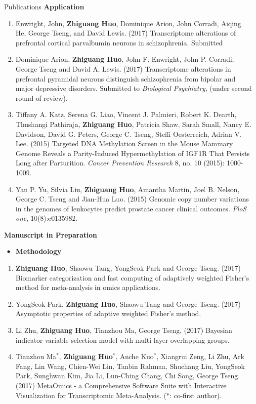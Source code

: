\documentclass{resume} %
\begin{document}
\begin{rSection}{Publications}
\textbf{Application}
\begin{enumerate}[noitemsep,topsep=0pt,resume]
\item Enwright, John, {\bf Zhiguang Huo}, Dominique Arion, John Corradi, Aiqing He, George Tseng, and David Lewis. (2017) 
Transcriptome alterations of prefrontal cortical parvalbumin neurons in schizophrenia. Submitted

    \item  Dominique Arion, {\bf Zhiguang Huo}, John F. Enwright, John P. Corradi, George Tseng and David A. Lewis. (2017)
Transcriptome alterations in prefrontal pyramidal neurons distinguish schizophrenia from bipolar and major depressive disorders.
Submitted to \emph{Biological Psychiatry}, (under second round of review).

    \item Tiffany A. Katz, Serena G. Liao, Vincent J. Palmieri, Robert K. Dearth, Thushangi Pathiraja, {\bf Zhiguang Huo}, Patricia Shaw, Sarah Small, Nancy E. Davidson, David G. Peters, George C. Tseng, Steffi Oesterreich, Adrian V. Lee. (2015) Targeted DNA Methylation Screen in the Mouse Mammary Genome Reveals a Parity-Induced Hypermethylation of IGF1R That Persists Long after Parturition. \emph{Cancer Prevention Research} 8, no. 10 (2015): 1000-1009.

    \item Yan P. Yu, Silvia Liu, {\bf Zhiguang Huo}, Amantha Martin, Joel B. Nelson, George C. Tseng and Jian-Hua Luo. (2015) Genomic copy number variations in the genomes of leukocytes predict prostate cancer clinical outcomes. \emph{PloS one}, 10(8):e0135982.

\end{enumerate}

\textbf{Manuscript in Preparation}
\begin{itemize}
\item \textbf{Methodology}
\end{itemize}

\begin{enumerate}[noitemsep,topsep=0pt,resume]
\item  {\bf Zhiguang Huo}, Shaowu Tang, YongSeok Park and George Tseng. (2017)
Biomarker categorization and fast computing of adaptively weighted Fisher's method for meta-analysis in omics applications.
\item  YongSeok Park, {\bf Zhiguang Huo}, Shaowu Tang and George Tseng. (2017)
Asymptotic properties of adaptive weighted Fisher's method.
\item Li Zhu, {\bf Zhiguang Huo}, Tianzhou Ma, George Tseng. (2017)
Bayesian indicator variable selection model with multi-layer overlapping groups.
\item Tianzhou Ma$^*$, {\bf Zhiguang Huo}$^*$, Anche Kuo$^*$, Xiangrui Zeng, Li Zhu, Ark Fang, Lin Wang, Chien-Wei Lin, Tanbin Rahman, Shuchang Liu, YongSeok Park, Sunghwan Kim, Jia Li, Lun-Ching Chang, Chi Song, George Tseng.  (2017)
MetaOmics - a Comprehensive Software Suite with Interactive Visualization for Transcriptomic Meta-Analysis.
($*$: co-first author).
\end{enumerate}


\end{rSection}
\end{document}
